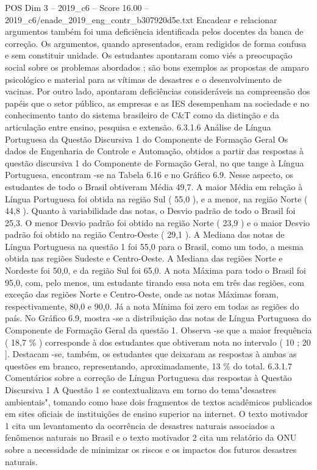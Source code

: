 \begin{textsample}{POS Dim 3 – 2019\_c6 – Score 16.00 – 2019\_c6/enade\_2019\_eng\_contr\_b307920d5e.txt}
Encadear e relacionar argumentos também foi uma deficiência identificada pelos docentes da banca de correção.
Os argumentos, quando apresentados, eram redigidos de forma confusa e sem constituir unidade.
Os estudantes apontaram como viés a preocupação social sobre os problemas abordados ; são bons exemplos as propostas de amparo psicológico e material para as vítimas de desastres e o desenvolvimento de vacinas.
Por outro lado, apontaram deficiências consideráveis na compreensão dos papéis que o setor público, as empresas e as IES desempenham na sociedade e no conhecimento tanto do sistema brasileiro de C\&T como da distinção e da articulação entre ensino, pesquisa e extensão. 6.3.1.6 Análise de Língua Portuguesa da Questão Discursiva 1 do Componente de Formação Geral Os dados de Engenharia de Controle e Automação, obtidos a partir das respostas à questão discursiva 1 do Componente de Formação Geral, no que tange à Língua Portuguesa, encontram -se na Tabela 6.16 e no Gráfico 6.9.
Nesse aspecto, os estudantes de todo o Brasil obtiveram Média 49,7.
A maior Média em relação à Língua Portuguesa foi obtida na região Sul ( 55,0 ), e a menor, na região Norte ( 44,8 ).
Quanto à variabilidade das notas, o Desvio padrão de todo o Brasil foi 25,3.
O menor Desvio padrão foi obtido na região Norte ( 23,9 ) e o maior Desvio padrão foi obtido na região Centro-Oeste ( 29,1 ).
A Mediana das notas de Língua Portuguesa na questão 1 foi 55,0 para o Brasil, como um todo, a mesma obtida nas regiões Sudeste e Centro-Oeste.
A Mediana das regiões Norte e Nordeste foi 50,0, e da região Sul foi 65,0.
A nota Máxima para todo o Brasil foi 95,0, com, pelo menos, um estudante tirando essa nota em três das regiões, com exceção das regiões Norte e Centro-Oeste, onde as notas Máximas foram, respectivamente, 80,0 e 90,0.
Já a nota Mínima foi zero em todas as regiões do país.
No Gráfico 6.9, mostra -se a distribuição das notas de Língua Portuguesa do Componente de Formação Geral da questão 1.
Observa -se que a maior frequência ( 18,7 \% ) corresponde à dos estudantes que obtiveram nota no intervalo ( 10 ; 20 ].
Destacam -se, também, os estudantes que deixaram as respostas à ambas as questões em branco, representando, aproximadamente, 13 \% do total. 6.3.1.7 Comentários sobre a correção de Língua Portuguesa das respostas à Questão Discursiva 1 A Questão 1 se contextualizava em torno do tema"desastres ambientais", tomando como base dois fragmentos de textos acadêmicos publicados em sites oficiais de instituições de ensino superior na internet.
O texto motivador 1 cita um levantamento da ocorrência de desastres naturais associados a fenômenos naturais no Brasil e o texto motivador 2 cita um relatório da ONU sobre a necessidade de minimizar os riscos e os impactos dos futuros desastres naturais.

\end{textsample}
